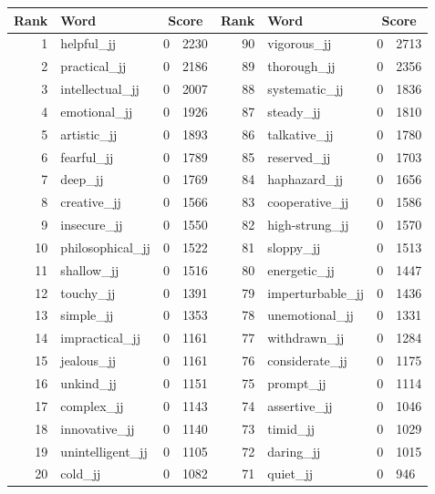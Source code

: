 \begin{table}[tbp]
    \begin{tabular}{| rlr@{.}l | rlr@{.}l |}
    \hline
    \textbf{Rank} & \textbf{Word} & \multicolumn{2}{c|}{\textbf{Score}} & \textbf{Rank} & \textbf{Word} & \multicolumn{2}{c|}{\textbf{Score}} \\
    \hline
    1 & helpful\_jj & 0 & 2230    &    90 & vigorous\_jj & 0 & 2713 \\
    2 & practical\_jj & 0 & 2186    &    89 & thorough\_jj & 0 & 2356 \\
    3 & intellectual\_jj & 0 & 2007    &    88 & systematic\_jj & 0 & 1836 \\
    4 & emotional\_jj & 0 & 1926    &    87 & steady\_jj & 0 & 1810 \\
    5 & artistic\_jj & 0 & 1893    &    86 & talkative\_jj & 0 & 1780 \\
    6 & fearful\_jj & 0 & 1789    &    85 & reserved\_jj & 0 & 1703 \\
    7 & deep\_jj & 0 & 1769    &    84 & haphazard\_jj & 0 & 1656 \\
    8 & creative\_jj & 0 & 1566    &    83 & cooperative\_jj & 0 & 1586 \\
    9 & insecure\_jj & 0 & 1550    &    82 & high-strung\_jj & 0 & 1570 \\
    10 & philosophical\_jj & 0 & 1522    &    81 & sloppy\_jj & 0 & 1513 \\
    11 & shallow\_jj & 0 & 1516    &    80 & energetic\_jj & 0 & 1447 \\
    12 & touchy\_jj & 0 & 1391    &    79 & imperturbable\_jj & 0 & 1436 \\
    13 & simple\_jj & 0 & 1353    &    78 & unemotional\_jj & 0 & 1331 \\
    14 & impractical\_jj & 0 & 1161    &    77 & withdrawn\_jj & 0 & 1284 \\
    15 & jealous\_jj & 0 & 1161    &    76 & considerate\_jj & 0 & 1175 \\
    16 & unkind\_jj & 0 & 1151    &    75 & prompt\_jj & 0 & 1114 \\
    17 & complex\_jj & 0 & 1143    &    74 & assertive\_jj & 0 & 1046 \\
    18 & innovative\_jj & 0 & 1140    &    73 & timid\_jj & 0 & 1029 \\
    19 & unintelligent\_jj & 0 & 1105    &    72 & daring\_jj & 0 & 1015 \\
    20 & cold\_jj & 0 & 1082    &    71 & quiet\_jj & 0 & 946 \\

\end{tabular}
\end{table}
